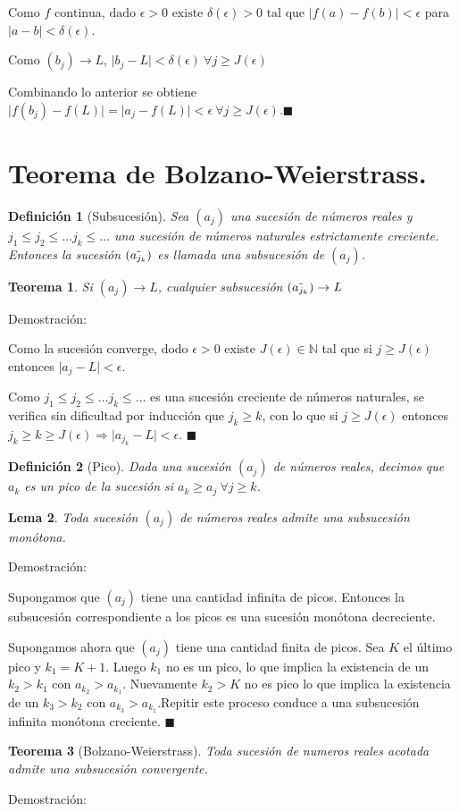 \documentclass[12pt]{book}
\newcommand\N{{\mathbb N}}
\providecommand{\abs}[1]{\lvert#1\rvert}
\newtheorem{teo}{Teorema}[section]
\newtheorem{lema}[teo]{Lema}
\newtheorem{defi}{Definición}[section]
\begin{document}
Como $f \mbox{ continua, dado }\epsilon>0 \mbox{ existe } \delta(\epsilon)>0 \mbox{ tal que } \abs{f(a)-f(b)}<\epsilon$ para $\abs{a-b}<\delta(\epsilon)$.

Como $(b_j) \rightarrow L$, $\abs{b_j-L}<\delta(\epsilon) \  \forall j \ge J(\epsilon)$

Combinando lo anterior se obtiene $\abs{f(b_j)-f(L)}=\abs{a_j-f(L)}<\epsilon \ \forall j \ge J(\epsilon)$.$\blacksquare$

\section{Teorema de Bolzano-Weierstrass.}
\begin{defi}[Subsucesión]\rm
Sea $(a_j)$ una sucesión de números reales y $j_1 \le j_2 \le \dots j_k \le \dots$ una sucesión de números naturales estrictamente creciente. Entonces la sucesión $(\Tilde{a_{j_k}})$ es llamada una subsucesión de $(a_j)$.
\end{defi}
\begin{teo}\rm
Si $(a_j) \rightarrow L$, cualquier subsucesión $(\Tilde{a_{j_k}}) \rightarrow L$
\end{teo}
Demostración:

Como la sucesión converge, dodo $\epsilon >0 \mbox{ existe } J(\epsilon) \in \N$ tal que si $j \ge J(\epsilon)$ entonces $\abs{a_j-L} < \epsilon$.

Como $j_1 \le j_2 \le \dots j_k \le \dots$ es una sucesión creciente de números naturales, se verifica sin dificultad por inducción que $j_k \ge k$, con lo que si $j \ge J(\epsilon)$ entonces $j_k \ge k \ge J(\epsilon) \Rightarrow \abs{a_{j_k}-L}<\epsilon$. $\blacksquare$
\begin{defi}[Pico]\rm
Dada una sucesión $(a_j)$ de números reales, decimos que $a_k$ es un pico de la sucesión si $a_k \ge a_j \ \forall{j \ge k}$.
\end{defi}
\begin{lema}\rm
Toda sucesión $(a_j)$ de números reales admite una subsucesión monótona.
\end{lema}
Demostración:

Supongamos que $(a_j)$ tiene una cantidad infinita de picos. Entonces la subsucesión correspondiente a los picos es una sucesión monótona decreciente.

Supongamos ahora que $(a_j)$ tiene una cantidad finita de picos. Sea $K$ el último pico y $k_1=K+1$. Luego $k_1$ no es un pico, lo que implica la existencia de un $k_2>k_1 \mbox{ con } a_{k_2}>a_{k_1}$. Nuevamente $k_2>K$ no es pico lo que implica la existencia de un $k_3>k_2 \mbox{ con } a_{k_3}>a_{k_1}$.Repitir este proceso conduce a una subsucesión infinita monótona creciente. $\blacksquare$
\begin{teo}[Bolzano-Weierstrass]\rm\label{BolzanoWe}
Toda sucesión de numeros reales acotada admite una subsucesión convergente.
\end{teo}
Demostración:
\end{document}
